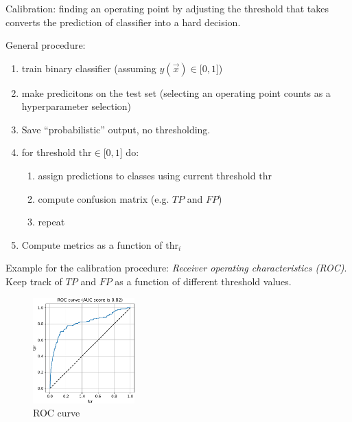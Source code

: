 \begin{frame}\frametitle{\subsubsecname}

Calibration: finding an operating point by adjusting the threshold that takes converts the prediction of classifier into a hard decision.

General procedure:
\begin{enumerate}
\item train binary classifier (assuming $y(\vec x) \in \lbrack0,1\rbrack$)
\item make predicitons on the test set (selecting an operating point counts as a hyperparameter selection)
\item Save ``probabilistic'' output, no thresholding.
\item for threshold $\mathrm{thr} \in \lbrack0,1\rbrack$ do:
\begin{enumerate}
	\item assign predictions to classes using current threshold $\mathrm{thr}$
	\item compute confusion matrix (e.g. $TP$ and $FP$)
	\item[]repeat
\end{enumerate}
\item Compute metrics as a function of $\mathrm{thr}_i$
\end{enumerate}



\end{frame}

\begin{frame}
Example for the calibration procedure: \emph{Receiver operating characteristics (ROC)}. Keep track of $TP$ and $FP$ as a function of different threshold values.

\begin{figure}[h]
	\includegraphics[width=0.35\textwidth]{img/curves_roc}
	\caption{ROC curve}
\end{figure}


\end{frame}

